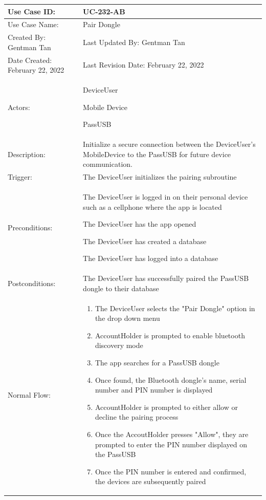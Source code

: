 \documentclass[stu]{apa7}
\newcommand{\nextitem}{\par\hspace*{\labelsep}\textbullet\hspace*{\labelsep}}
\begin{document}
\pagebreak

\scriptsize{\begin{xltabular}{\textwidth}{|l|X|}
  \hline Use Case ID: & UC-232-AB \\ \hline

  Use Case Name: & Pair Dongle \\ \hline

  Created By: Gentman Tan & Last Updated By: Gentman Tan\\ \hline

  Date Created: February 22, 2022 & Last Revision Date: February 22, 2022 \\ \hline

  Actors: & \nextitem DeviceUser 
    \nextitem Mobile Device
    \nextitem PassUSB \\ \hline
  
  Description: &  Initialize a secure connection between the DeviceUser’s MobileDevice to the PassUSB for future device communication. \\ \hline

  Trigger: &  The DeviceUser initializes the pairing subroutine \\ \hline

  Preconditions: & \nextitem The DeviceUser is logged in on their personal device such as a cellphone where the app is located \nextitem The DeviceUser has the app opened \nextitem The DeviceUser has created a database \nextitem The DeviceUser has logged into a database \\ \hline

  Postconditions: & \nextitem The DeviceUser has successfully paired the PassUSB dongle to their database  \\ \hline

  Normal Flow: & 
    \begin{enumerate}
      \item The DeviceUser selects the "Pair Dongle" option in the drop down menu
      \item AccountHolder is prompted to enable bluetooth discovery mode
      \item The app searches for a PassUSB dongle
      \item Once found, the Bluetooth dongle's name, serial number and PIN number is displayed
      \item AccountHolder is prompted to either allow or decline the pairing process
      \item Once the AccoutHolder presses "Allow", they are prompted to enter the PIN number displayed on the PassUSB
      \item Once the PIN number is entered and confirmed, the devices are subsequently paired
    \end{enumerate} \\ \hline


\end{xltabular}}
\end{document}
